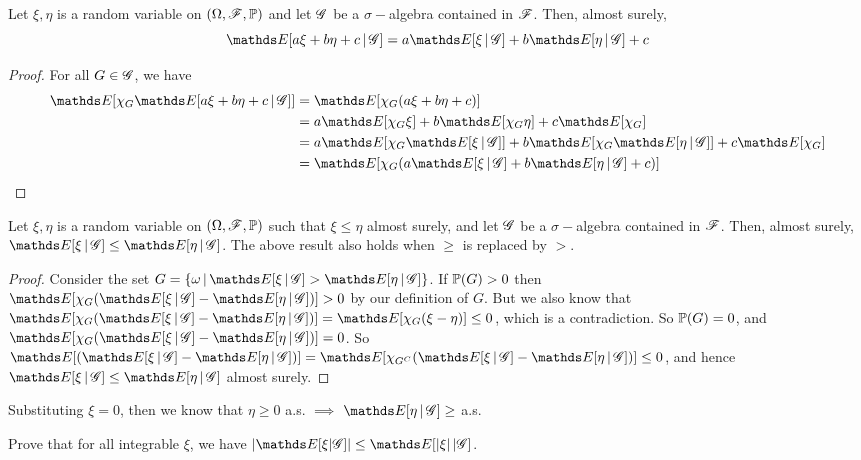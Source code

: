 \begin{property}[I. Linearity] 
Let $\xi,\eta$ is a random variable on $(\Omega, \mathcal{F}, \mathbb{P})$ and let $\mathcal{G}$ be a $\sigma-$algebra contained in $\mathcal{F}$. Then, almost surely,
\begin{equation} \label{eq:linearity_conditional_expectation}
    \E[a\xi + b\eta + c \,|\, \G] = a\E[\xi \,|\, \G] + b \E[\eta \,|\, \G ] + c
\end{equation}
\end{property}

\begin{proof}
For all $G \in \mathcal{G}$, we have
\begin{align*}
    \E[\chi_G \E[a\xi + b\eta + c \,|\, \G]] 
    &= \E[\chi_G (a\xi + b\eta + c)] \\
    &= a\E[\chi_G\xi] + b\E[\chi_G \eta] + c\E[\chi_G] \\
    &= a\E[\chi_G \E[\xi\,|\,\G]] + b\E[\chi_G \E[\eta\,|\,\G]] + c\E[\chi_G] \\
    &= \E[\chi_G (a\E[\xi \,|\, \G] + b \E[\eta \,|\, \G ] + c)]
\end{align*}
\end{proof}

\begin{property}[II. Monotonicity] \label{prop:conditional_expectation_monotonicity} 
Let $\xi, \eta$ is a random variable on $(\Omega, \mathcal{F}, \mathbb{P})$ such that $\xi \leq \eta$ almost surely, and let $\mathcal{G}$ be a $\sigma-$algebra contained in $\mathcal{F}$. Then, almost surely, $\E[\xi\,|\,\G] \leq \E[\eta \,|\, \G]$. The above result also holds when $\geq$ is replaced by $>$.
\end{property}

\begin{proof}
Consider the set $G = \set{\omega\,|\,\E[\xi\,|\,\G] > \E[\eta\,|\,\G]}$. If $\mathbb{P}(G) > 0$ then $\E[\chi_G (\E[\xi\,|\,\G] - \E[\eta\,|\,\G])] > 0$ by our definition of $G$. But we also know that $\E[\chi_G (\E[\xi\,|\,\G] - \E[\eta\,|\,\G])] = \E[\chi_G (\xi-\eta)] \leq 0$, which is a contradiction. So $\mathbb{P}(G) = 0$, and $\E[\chi_G (\E[\xi\,|\,\G] - \E[\eta\,|\,\G])] = 0$. So $\E[(\E[\xi\,|\,\G] - \E[\eta\,|\,\G])] = \E[\chi_{G^C} (\E[\xi\,|\,\G] - \E[\eta\,|\,\G])] \leq 0$, and hence $\E[\xi\,|\,\G] \leq \E[\eta\,|\,\G]$ almost surely.
\end{proof}

Substituting $\xi = 0$, then we know that $\eta \geq 0$ a.s. $\implies$ $\E[\eta\,|\,\G] \geq$ a.s.

\begin{exercise}
Prove that for all integrable $\xi$, we have $|\E[\xi|\G]| \leq \E[|\xi| \, | \G]$.
\end{exercise}

